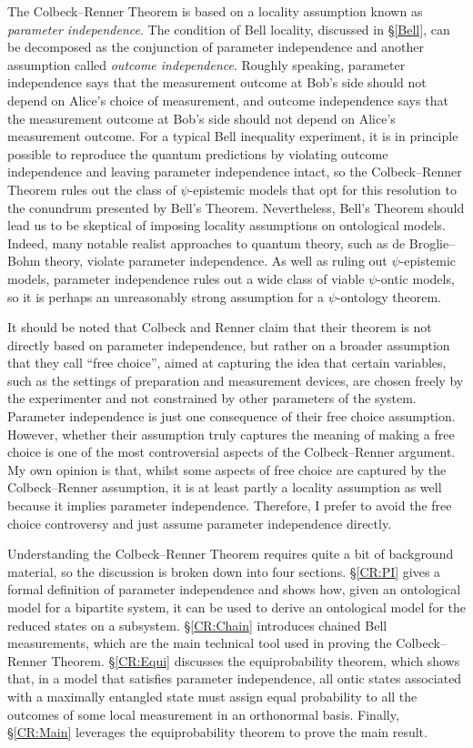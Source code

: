 \documentclass[DIV=calc,fontsize=12pt]{scrartcl} %
\theoremstyle{definition}
\theoremstyle{plain}
\begin{document}
The Colbeck--Renner Theorem is based on a locality assumption known as
\emph{parameter independence}.  The condition of Bell locality,
discussed in \S\ref{Bell}, can be decomposed as the conjunction of
parameter independence and another assumption called \emph{outcome
independence}.  Roughly speaking, parameter independence says that
the measurement outcome at Bob's side should not depend on Alice's
choice of measurement, and outcome independence says that the
measurement outcome at Bob's side should not depend on Alice's
measurement outcome.  For a typical Bell inequality experiment, it is
in principle possible to reproduce the quantum predictions by
violating outcome independence and leaving parameter independence
intact, so the Colbeck--Renner Theorem rules out the class of
$\psi$-epistemic models that opt for this resolution to the conundrum
presented by Bell's Theorem.  Nevertheless, Bell's Theorem should lead
us to be skeptical of imposing locality assumptions on ontological
models.  Indeed, many notable realist approaches to quantum theory,
such as de Broglie--Bohm theory, violate parameter independence.  As
well as ruling out $\psi$-epistemic models, parameter independence
rules out a wide class of viable $\psi$-ontic models, so it is perhaps
an unreasonably strong assumption for a $\psi$-ontology theorem.

It should be noted that Colbeck and Renner claim that their theorem is
not directly based on parameter independence, but rather on a broader
assumption that they call ``free choice'', aimed at capturing the idea
that certain variables, such as the settings of preparation and
measurement devices, are chosen freely by the experimenter and not
constrained by other parameters of the system.  Parameter independence
is just one consequence of their free choice assumption.  However,
whether their assumption truly captures the meaning of making a free
choice is one of the most controversial aspects of the Colbeck--Renner
argument.  My own opinion is that, whilst some aspects of free choice
are captured by the Colbeck--Renner assumption, it is at least partly a
locality assumption as well because it implies parameter independence.
Therefore, I prefer to avoid the free choice controversy and just
assume parameter independence directly.

Understanding the Colbeck--Renner Theorem requires quite a bit of
background material, so the discussion is broken down into four
sections.  \S\ref{CR:PI} gives a formal definition of parameter
independence and shows how, given an ontological model for a bipartite
system, it can be used to derive an ontological model for the reduced
states on a subsystem.  \S\ref{CR:Chain} introduces chained Bell
measurements, which are the main technical tool used in proving the
Colbeck--Renner Theorem.  \S\ref{CR:Equi} discusses the equiprobability
theorem, which shows that, in a model that satisfies parameter
independence, all ontic states associated with a maximally entangled
state must assign equal probability to all the outcomes of some local
measurement in an orthonormal basis.  Finally, \S\ref{CR:Main}
leverages the equiprobability theorem to prove the main result.
\end{document}
